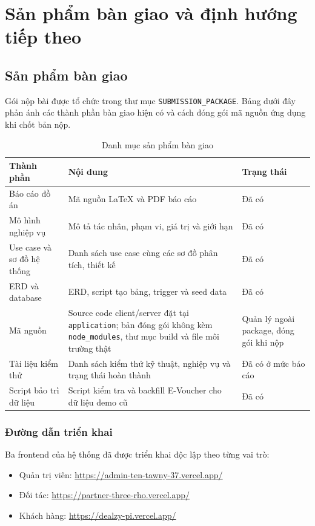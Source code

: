 \chapter{Sản phẩm bàn giao và định hướng tiếp theo}

\section{Sản phẩm bàn giao}

Gói nộp bài được tổ chức trong thư mục \texttt{SUBMISSION\_PACKAGE}. Bảng dưới đây phản ánh các thành phần bàn giao hiện có và cách đóng gói mã nguồn ứng dụng khi chốt bản nộp.

\begin{table}[H]
\centering
\small
\begin{tabularx}{\textwidth}{|p{4.0cm}|Y|p{3.0cm}|}
\hline
\textbf{Thành phần} & \textbf{Nội dung} & \textbf{Trạng thái} \\ \hline
Báo cáo đồ án & Mã nguồn LaTeX và PDF báo cáo & Đã có \\ \hline
Mô hình nghiệp vụ & Mô tả tác nhân, phạm vi, giá trị và giới hạn & Đã có \\ \hline
Use case và sơ đồ hệ thống & Danh sách use case cùng các sơ đồ phân tích, thiết kế & Đã có \\ \hline
ERD và database & ERD, script tạo bảng, trigger và seed data & Đã có \\ \hline
Mã nguồn & Source code client/server đặt tại \texttt{application}; bản đóng gói không kèm \texttt{node\_modules}, thư mục build và file môi trường thật & Quản lý ngoài package, đóng gói khi nộp \\ \hline
Tài liệu kiểm thử & Danh sách kiểm thử kỹ thuật, nghiệp vụ và trạng thái hoàn thành & Đã có ở mức báo cáo \\ \hline
Script bảo trì dữ liệu & Script kiểm tra và backfill E-Voucher cho dữ liệu demo cũ & Đã có \\ \hline
\end{tabularx}
\caption{Danh mục sản phẩm bàn giao}
\end{table}

\subsection{Đường dẫn triển khai}

Ba frontend của hệ thống đã được triển khai độc lập theo từng vai trò:

\begin{itemize}[leftmargin=1.2cm]
    \item Quản trị viên: \url{https://admin-ten-tawny-37.vercel.app/}
    \item Đối tác: \url{https://partner-three-rho.vercel.app/}
    \item Khách hàng: \url{https://dealzy-pi.vercel.app/}
\end{itemize}


